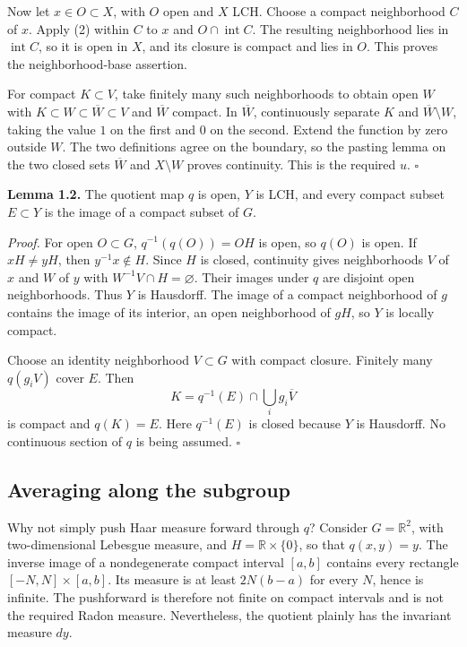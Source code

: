 \documentclass[
  english,
  11pt,
  a4paper,
]{article}
\begin{document}
Now let \(x\in O\subset X\), with \(O\) open and \(X\) LCH. Choose a
compact neighborhood \(C\) of \(x\). Apply (2) within \(C\) to \(x\) and
\(O\cap\operatorname{int}C\). The resulting neighborhood lies in
\(\operatorname{int}C\), so it is open in \(X\), and its closure is
compact and lies in \(O\). This proves the neighborhood-base assertion.

For compact \(K\subset V\), take finitely many such neighborhoods to
obtain open \(W\) with \(K\subset W\subset\overline W\subset V\) and
\(\overline W\) compact. In \(\overline W\), continuously separate \(K\)
and \(\overline W\setminus W\), taking the value \(1\) on the first and
\(0\) on the second. Extend the function by zero outside \(W\). The two
definitions agree on the boundary, so the pasting lemma on the two
closed sets \(\overline W\) and \(X\setminus W\) proves continuity. This
is the required \(u\). \(\square\)

\textbf{Lemma 1.2.} The quotient map \(q\) is open, \(Y\) is LCH, and
every compact subset \(E\subset Y\) is the image of a compact subset of
\(G\).

\emph{Proof.} For open \(O\subset G\), \(q^{-1}(q(O))=OH\) is open, so
\(q(O)\) is open. If \(xH\neq yH\), then \(y^{-1}x\notin H\). Since
\(H\) is closed, continuity gives neighborhoods \(V\) of \(x\) and \(W\)
of \(y\) with \(W^{-1}V\cap H=\varnothing\). Their images under \(q\)
are disjoint open neighborhoods. Thus \(Y\) is Hausdorff. The image of a
compact neighborhood of \(g\) contains the image of its interior, an
open neighborhood of \(gH\), so \(Y\) is locally compact.

Choose an identity neighborhood \(V\subset G\) with compact closure.
Finitely many \(q(g_iV)\) cover \(E\). Then
\[K=q^{-1}(E)\cap\bigcup_i g_i\overline V\] is compact and \(q(K)=E\).
Here \(q^{-1}(E)\) is closed because \(Y\) is Hausdorff. No continuous
section of \(q\) is being assumed. \(\square\)

\subsection{Averaging along the
subgroup}\label{quotient-measures-and-weils-integration-formula--averaging-along-the-subgroup}

Why not simply push Haar measure forward through \(q\)? Consider
\(G=\mathbb R^2\), with two-dimensional Lebesgue measure, and
\(H=\mathbb R\times\{0\}\), so that \(q(x,y)=y\). The inverse image of a
nondegenerate compact interval \([a,b]\) contains every rectangle
\([-N,N]\times[a,b]\). Its measure is at least \(2N(b-a)\) for every
\(N\), hence is infinite. The pushforward is therefore not finite on
compact intervals and is not the required Radon measure. Nevertheless,
the quotient plainly has the invariant measure \(dy\).
\end{document}
